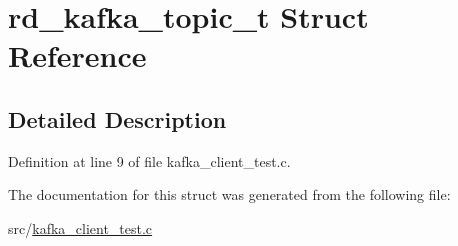 \hypertarget{structrd__kafka__topic__t}{\section{rd\-\_\-kafka\-\_\-topic\-\_\-t \-Struct \-Reference}
\label{structrd__kafka__topic__t}
}


\subsection{\-Detailed \-Description}


\-Definition at line 9 of file kafka\-\_\-client\-\_\-test.\-c.



\-The documentation for this struct was generated from the following file\-:\begin{DoxyCompactItemize}
\item 
src/\hyperlink{kafka__client__test_8c}{kafka\-\_\-client\-\_\-test.\-c}\end{DoxyCompactItemize}
